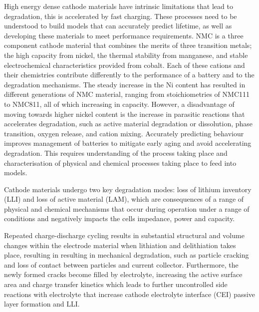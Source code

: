 \documentclass[journal=jacsat,manuscript=article]{achemso}
\begin{document}
High energy dense cathode materials have intrinsic limitations that lead to degradation, this is accelerated by fast charging.\cite{Xia2018} These processes need to be understood to build  models that can accurately predict lifetime, as well as developing these materials to meet performance requirements.\cite{Hendricks2015} NMC is a three component cathode material that combines the merits of three transition metals; the high capacity from nickel, the thermal stability from manganese, and stable electrochemical characteristics provided from cobalt. Each of these cations and their chemistries contribute differently to the performance of a battery and to the degradation mechanisms.\cite{Julien2014} The steady increase in the Ni content has resulted in different generations of NMC material, ranging from stoichiometries of NMC111 to NMC811, all of which increasing in capacity.\cite{Sari2019} However, a disadvantage of moving towards higher nickel content is the increase in parasitic reactions that accelerates  degradation, such as active material degradation or dissolution, phase transition, oxygen release, and cation mixing.\cite{Dixit2017} Accurately predicting behaviour improves management of batteries to mitigate early aging and avoid accelerating degradation. This requires understanding of the process taking place and characterisation of physical and chemical processes taking place to feed into models.   

Cathode materials undergo two key degradation modes: loss of lithium inventory (LLI) and loss of active material (LAM), which are consequences of a range of physical and chemical mechanisms that occur during operation under a range of conditions and negatively impacts the cells impedance, power and capacity.\cite{erickson2017recent,erickson2017recent} 

Repeated charge-discharge cycling results in substantial structural and volume changes within the electrode material when lithiation and delithiation takes place, resulting in resulting in mechanical degradation, such as particle cracking \cite{Woodford2010} and loss of contact between particles and current collector.\cite{erickson2017recent} Furthermore, the newly formed cracks become filled by electrolyte, increasing the active surface area and charge transfer kinetics which leads to further uncontrolled side reactions with electrolyte that increase cathode electrolyte interface (CEI) passive layer formation and LLI.\cite{erickson2017recent}
\end{document}
